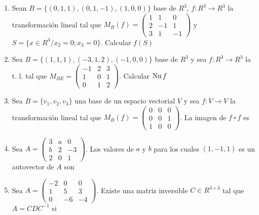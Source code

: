 \documentclass[../practica.root.tex]{subfiles}
\begin{document}
\begin{enumerate}
    \item Sean $B = \{(0,1,1),(0,1,-1),(1,0,0)\}$ base de $R^3$, $f : R^3 \to R^3$ la transformación lineal tal que $M_B(f)=\begin{pmatrix}
              1 & 1 & 0 \\ 2 & -1 & 1 \\ 3 & 1 & -1
          \end{pmatrix}$ y $S = \{x \in R^3 / x_2 = 0; x_3 = 0\}$. Calcular $f(S)$

    \item Sea $B = \{(1,1,1),(-3,1,2),(-1,0,0)\}$ base de $R^3$ y sea $f : R^3 \to R^3$ la t. l. tal que $M_{BE} = \begin{pmatrix}
              -1 & 2 & 3 \\ 1 & 0 & 1 \\ 0 & 1 & 2
          \end{pmatrix}$.
          Calcular $\operatorname{Nu} f$

    \item Sea $B = \{v_1,v_2,v_3\}$ una base de un espacio vectorial $V$ y sea $f : V \to V$ la transformación lineal tal que $M_B(f) = \begin{pmatrix}
              0 & 0 & 0 \\ 0 & 0 & 1 \\ 1 & 0 & 0
          \end{pmatrix}$. La imagen de $f \circ f$ es

    \item Sea $A = \begin{pmatrix}
              3 & a & 0 \\ b & 2 & -3 \\ 2 & 0 & 1
          \end{pmatrix}$. Los valores de $a$ y $b$ para los cuales $(1,-1,1)$ es un autovector de $A$ son

    \item Sea $A = \begin{pmatrix}
              -2 & 0 & 0 \\ 1 & 5 & 3 \\ 0 & -6 & -4
          \end{pmatrix}$. Existe una matriz inversible $C \in R^{3×3}$ tal que $A = CDC^{-1}$ si
\end{enumerate}
\end{document}
